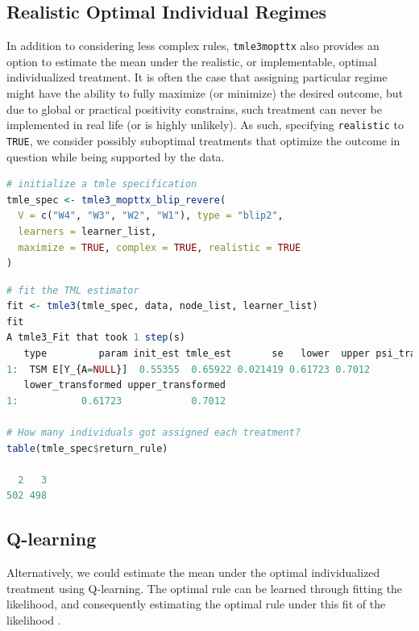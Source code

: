 \documentclass[12pt, krantz2,]{krantz}
\newcommand{\passthrough}[1]{#1}
\theoremstyle{definition}
\theoremstyle{definition}
\theoremstyle{definition}
\newcommand{\1}{\mathbbm{1}}
\begin{document}
\hypertarget{realistic-optimal-individual-regimes}{%
\subsection{Realistic Optimal Individual Regimes}\label{realistic-optimal-individual-regimes}}

In addition to considering less complex rules, \passthrough{\lstinline!tmle3mopttx!} also provides an
option to estimate the mean under the realistic, or implementable, optimal
individualized treatment. It is often the case that assigning particular regime
might have the ability to fully maximize (or minimize) the desired outcome, but
due to global or practical positivity constrains, such treatment can never be
implemented in real life (or is highly unlikely). As such, specifying
\passthrough{\lstinline!realistic!} to \passthrough{\lstinline!TRUE!}, we consider possibly suboptimal treatments that optimize
the outcome in question while being supported by the data.

\begin{lstlisting}[language=R]
# initialize a tmle specification
tmle_spec <- tmle3_mopttx_blip_revere(
  V = c("W4", "W3", "W2", "W1"), type = "blip2",
  learners = learner_list,
  maximize = TRUE, complex = TRUE, realistic = TRUE
)
\end{lstlisting}

\begin{lstlisting}[language=R]
# fit the TML estimator
fit <- tmle3(tmle_spec, data, node_list, learner_list)
fit
A tmle3_Fit that took 1 step(s)
   type         param init_est tmle_est       se   lower  upper psi_transformed
1:  TSM E[Y_{A=NULL}]  0.55355  0.65922 0.021419 0.61723 0.7012         0.65922
   lower_transformed upper_transformed
1:           0.61723            0.7012

# How many individuals got assigned each treatment?
table(tmle_spec$return_rule)

  2   3 
502 498 
\end{lstlisting}

\hypertarget{q-learning}{%
\subsection{Q-learning}\label{q-learning}}

Alternatively, we could estimate the mean under the optimal individualized
treatment using Q-learning. The optimal rule can be learned through fitting the
likelihood, and consequently estimating the optimal rule under this fit of the
likelihood \citep{Sutton1998, murphy2003}.
\end{document}

